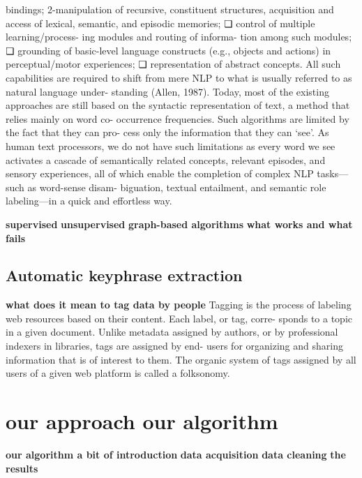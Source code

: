 \documentclass[11pt]{report}%
\begin{document}
bindings;
2-manipulation of recursive, constituent structures,
 acquisition and access of lexical, semantic, and episodic memories;
❏ control of multiple learning/process- ing modules and routing of informa- tion among such modules;
❏ grounding of basic-level language constructs (e.g., objects and actions) in perceptual/motor experiences;
❏ representation of abstract concepts.
All such capabilities are required to shift from mere NLP to what is usually referred to as natural language under- standing (Allen, 1987). Today, most of the existing approaches are still based on the syntactic representation of text, a method that relies mainly on word co- occurrence frequencies. Such algorithms are limited by the fact that they can pro- cess only the information that they can ‘see’. As human text processors, we do not have such limitations as every word we see activates a cascade of semantically related concepts, relevant episodes, and sensory experiences, all of which enable the completion of complex NLP tasks—such as word-sense disam- biguation, textual entailment, and semantic role labeling—in a quick and
effortless way.

\textbf{supervised} \newline
\textbf{unsupervised}\newline
\textbf{graph-based algorithms}\newline
\textbf{what works and what fails}\newline
\section {Automatic keyphrase extraction}
\textbf{what does it mean to tag data by people}
Tagging is the process of labeling web resources based on their content. Each label, or tag, corre- sponds to a topic in a given document. Unlike metadata assigned by authors, or by professional indexers in libraries, tags are assigned by end- users for organizing and sharing information that is of interest to them. The organic system of tags assigned by all users of a given web platform is called a folksonomy.\cite{folksonomy}


\chapter{our approach our algorithm}
\textbf{our algorithm a bit of introduction}\newline
\textbf{data acquisition}\newline
\textbf{data cleaning}\newline
\textbf{the results}\newline
\end{document}
